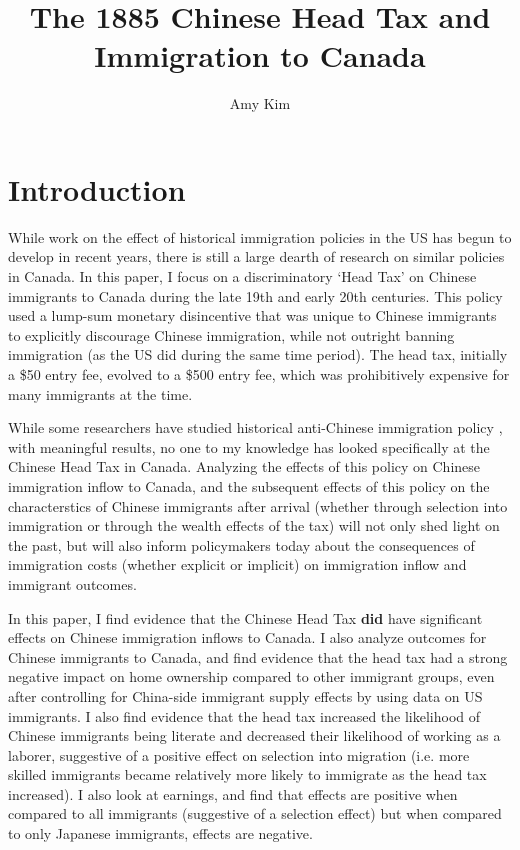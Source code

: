 \documentclass[12pt]{article}
\title{The 1885 Chinese Head Tax and Immigration to Canada}
\author{Amy Kim}
\begin{document}
\maketitle

\section{Introduction}
While work on the effect of historical immigration policies in the US has begun to develop in recent years, there is still a large dearth of research on similar policies in Canada. In this paper, I focus on a discriminatory `Head Tax' on Chinese immigrants to Canada during the late 19th and early 20th centuries. This policy used a lump-sum monetary disincentive that was unique to Chinese immigrants to explicitly discourage Chinese immigration, while not outright banning immigration (as the US did during the same time period). The head tax, initially a \$50 entry fee, evolved to a \$500 entry fee, which was prohibitively expensive for many immigrants at the time.

While some researchers have studied historical anti-Chinese immigration policy \citep{Chen2015, ChenXie2020, Postel2023}, with meaningful results, no one to my knowledge has looked specifically at the Chinese Head Tax in Canada. Analyzing the effects of this policy on Chinese immigration inflow to Canada, and the subsequent effects of this policy on the characterstics of Chinese immigrants after arrival (whether through selection into immigration or through the wealth effects of the tax) will not only shed light on the past, but will also inform policymakers today about the consequences of immigration costs (whether explicit or implicit) on immigration inflow and immigrant outcomes.

In this paper, I find evidence that the Chinese Head Tax \textbf{did} have significant effects on Chinese immigration inflows to Canada. I also analyze outcomes for Chinese immigrants to Canada, and find evidence that the head tax had a strong negative impact on home ownership compared to other immigrant groups, even after controlling for China-side immigrant supply effects by using data on US immigrants. 
I also find evidence that the head tax increased the likelihood of Chinese immigrants being literate and decreased their likelihood of working as a laborer, suggestive of a positive effect on selection into migration (i.e. more skilled immigrants became relatively more likely to immigrate as the head tax increased). I also look at earnings, and find that effects are positive when compared to all immigrants (suggestive of a selection effect) but when compared to only Japanese immigrants, effects are negative.
\end{document}
